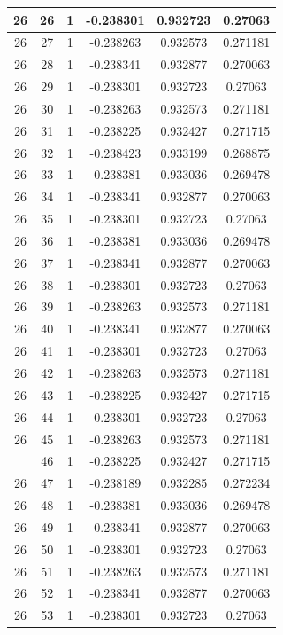 \documentclass[12pt,a4paper]{article}
\numberwithin{equation}{section}
\numberwithin{figure}{section}
\numberwithin{table}{section}
\begin{document}
\begin{longtable}{|c|c|c|c|c|c|}
26 & 26 & 1 & -0.238301 & 0.932723 & 0.27063 \\ \hline
26 & 27 & 1 & -0.238263 & 0.932573 & 0.271181 \\ \hline
26 & 28 & 1 & -0.238341 & 0.932877 & 0.270063 \\ \hline
26 & 29 & 1 & -0.238301 & 0.932723 & 0.27063 \\ \hline
26 & 30 & 1 & -0.238263 & 0.932573 & 0.271181 \\ \hline
26 & 31 & 1 & -0.238225 & 0.932427 & 0.271715 \\ \hline
26 & 32 & 1 & -0.238423 & 0.933199 & 0.268875 \\ \hline
26 & 33 & 1 & -0.238381 & 0.933036 & 0.269478 \\ \hline
26 & 34 & 1 & -0.238341 & 0.932877 & 0.270063 \\ \hline
26 & 35 & 1 & -0.238301 & 0.932723 & 0.27063 \\ \hline
26 & 36 & 1 & -0.238381 & 0.933036 & 0.269478 \\ \hline
26 & 37 & 1 & -0.238341 & 0.932877 & 0.270063 \\ \hline
26 & 38 & 1 & -0.238301 & 0.932723 & 0.27063 \\ \hline
26 & 39 & 1 & -0.238263 & 0.932573 & 0.271181 \\ \hline
26 & 40 & 1 & -0.238341 & 0.932877 & 0.270063 \\ \hline
26 & 41 & 1 & -0.238301 & 0.932723 & 0.27063 \\ \hline
26 & 42 & 1 & -0.238263 & 0.932573 & 0.271181 \\ \hline
26 & 43 & 1 & -0.238225 & 0.932427 & 0.271715 \\ \hline
26 & 44 & 1 & -0.238301 & 0.932723 & 0.27063 \\ \hline
26 & 45 & 1 & -0.238263 & 0.932573 & 0.271181 \\ \hline
\pagebreak
26 & 46 & 1 & -0.238225 & 0.932427 & 0.271715 \\ \hline
26 & 47 & 1 & -0.238189 & 0.932285 & 0.272234 \\ \hline
26 & 48 & 1 & -0.238381 & 0.933036 & 0.269478 \\ \hline
26 & 49 & 1 & -0.238341 & 0.932877 & 0.270063 \\ \hline
26 & 50 & 1 & -0.238301 & 0.932723 & 0.27063 \\ \hline
26 & 51 & 1 & -0.238263 & 0.932573 & 0.271181 \\ \hline
26 & 52 & 1 & -0.238341 & 0.932877 & 0.270063 \\ \hline
26 & 53 & 1 & -0.238301 & 0.932723 & 0.27063 \\ \hline

\end{longtable}
\end{document}
